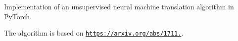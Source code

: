 Implementation of an unsupervised neural machine translation algorithm in Py\+Torch.

The algorithm is based on \href{https://arxiv.org/abs/1711.00043}{\tt https\+://arxiv.\+org/abs/1711.}. 